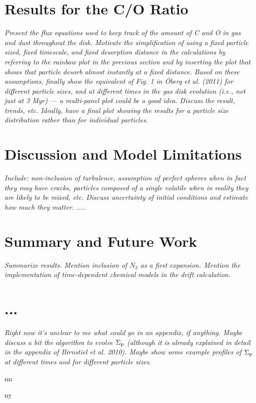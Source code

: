 \documentclass[apj]{emulateapj}
\newcommand\bibinc{n}		%
\newcommand{\emgr}[1]{\emph{ \color{gray} #1}}
\begin{document}
\section{Results for the C/O Ratio}
\emgr{Present the flux equations used to keep track of the amount of C and O in gas and dust throughout the disk. Motivate the simplification of using a fixed particle sized, fixed timescale, and fixed desorption distance in the calculations by referring to the rainbow plot in the previous section and by inserting the plot that shows that particle desorb almost instantly at a fixed distance. Based on these assumptions, finally show the equivalent of Fig. 1 in \"Oberg et al. (2011) for different particle sizes, and at different times in the gas disk evolution (i.e., not just at 3 Myr) --- a multi-panel plot could be a good idea. Discuss the result, trends, etc. Ideally, have a final plot showing the results for a particle size distribution rather than for individual particles.}

\section{Discussion and Model Limitations}

\emgr{Include: non-inclusion of turbulence, assumption of perfect spheres when in fact they may have cracks, particles composed of a single volatile when in reality they are likely to be mixed, etc. Discuss uncertainty of initial conditions and estimate how much they matter. ....}

\section{Summary and Future Work}

\emgr{Summarize results. Mention inclusion of $N_2$ as a first expansion. Mention the implementation of time-dependent chemical models in the drift calculation.}

\appendix
\section{...}

\emgr{Right now it's unclear to me what could go in an appendix, if anything. Maybe discuss a bit the algorithm to evolve $\Sigma_{\rm p}$ (although it is already explained in detail in the appendix of Birnstiel et al. 2010). Maybe show some example profiles of $\Sigma_{\rm p}$ at different times and for different particle sizes.}

\if\bibinc n

\fi

\if\bibinc y
\begin{thebibliography}
\end{thebibliography}
\fi
\end{document}

